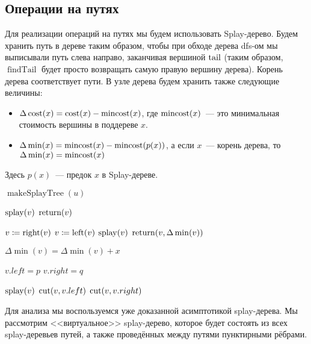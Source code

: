 \subsection{Операции на путях}

Для реализации операций на путях мы будем использовать Splay-дерево. Будем хранить путь в дереве таким образом, чтобы при обходе дерева dfs-ом мы выписывали путь слева направо, заканчивая вершиной $\operatorname{tail}$ (таким образом, $\operatorname{findTail}$ будет просто возвращать самую правую вершину дерева). Корень дерева соответствует пути. В узле дерева будем хранить также следующие величины:

\begin{itemize}
	\item $\Delta \operatorname{cost}(x) = \operatorname{cost}(x) - \operatorname{mincost}(x)$, где $\operatorname{mincost}(x)$~--- это минимальная стоимость вершины в поддереве $x$.
	\item $\Delta \min(x) = \operatorname{mincost}(x) - \operatorname{mincost}(p(x))$, а если $x$~--- корень дерева, то $\Delta \min(x) = \operatorname{mincost}(x)$
\end{itemize}

Здесь $p(x)$~--- предок $x$ в Splay-дереве.

\begin{algorithmic}[1]
		\State $\operatorname{makeSplayTree}(u)$
	\EndProcedure

		\State $\operatorname{splay}(v)$
		\State $\operatorname{return}(v)$
	\EndProcedure

				\State $v \coloneqq \operatorname{right}(v)$
			\Else
				\State $v \coloneqq \operatorname{left}(v)$
			\EndIf
		\EndWhile
		\State $\operatorname{splay}(v)$
		\State $\operatorname{return}(v, \Delta \min(v))$
	\EndProcedure

		\State $\Delta \min(v) = \Delta \min(v) + x$
	\EndProcedure

		\State $v.left = p$
		\State $v.right = q$
	\EndProcedure

		\State $\operatorname{splay}(v)$
		\State $\operatorname{cut}(v, v.left)$
		\State $\operatorname{cut}(v, v.right)$
	\EndProcedure

\end{algorithmic}

Для анализа мы воспользуемся уже доказанной асимптотикой splay-дерева. Мы рассмотрим <<виртуальное>> splay-дерево, которое будет состоять из всех splay-деревьев путей, а также проведённых между путями пунктирными рёбрами.

